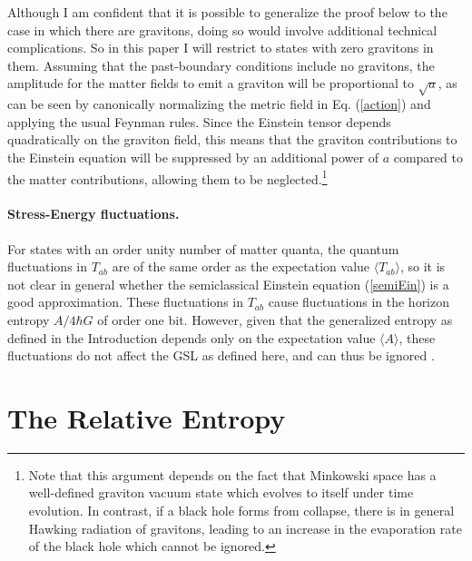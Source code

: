 \documentclass[12pt]{article}
\begin{document}
Although I am confident that it is possible to generalize the proof below to the case in which there are gravitons, doing so would involve additional technical complications.  So in this paper I will restrict to states with zero gravitons in them.  Assuming that the past-boundary conditions include no gravitons, the amplitude for the matter fields to emit a graviton will be proportional to $\sqrt{a}$, as can be seen by canonically normalizing the metric field in Eq. (\ref{action}) and applying the usual Feynman rules.  Since the Einstein tensor depends quadratically on the graviton field, this means that the graviton contributions to the Einstein equation will be suppressed by an additional power of $a$ compared to the matter contributions, allowing them to be neglected.\footnote{Note that this argument depends on the fact that Minkowski space has a well-defined graviton vacuum state which evolves to itself under time evolution.  In contrast, if a black hole forms from collapse, there is in general Hawking radiation of gravitons, leading to an increase in the evaporation rate of the black hole which cannot be ignored.}

\paragraph{\textbf{Stress-Energy fluctuations.}}  For states with an order unity number of matter quanta, the quantum fluctuations in $T_{ab}$ are of the same order as the expectation value $\langle T_{ab} \rangle$, so it is not clear in general whether the semiclassical Einstein equation (\ref{semiEin}) is a good approximation.  These fluctuations in $T_{ab}$ cause fluctuations in the horizon entropy $A / 4\hbar G$ of order one bit.  However, given that the generalized entropy as defined in the Introduction depends only on the expectation value $\langle A \rangle$, these fluctuations do not affect the GSL as defined here, and can thus be ignored \cite{10proofs}.

\section{The Relative Entropy}\label{rel}
\end{document}
